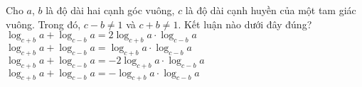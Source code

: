 \begin{ex}%
Cho $a$, $b$ là độ dài hai cạnh góc vuông, $c$ là độ dài cạnh huyền của một tam giác vuông. Trong đó, $c-b\ne 1$ và $c+b\ne 1$. Kết luận nào dưới đây đúng?
\choice
{\True $\log_{c+b}a+\log_{c-b}a=2\log_{c+b}a\cdot\log_{c-b}a$}
{$\log_{c+b}a+\log_{c-b}a=\log_{c+b}a\cdot\log_{c-b}a$}
{$\log_{c+b}a+\log_{c-b}a=-2\log_{c+b}a\cdot\log_{c-b}a$}
{$\log_{c+b}a+\log_{c-b}a=-\log_{c+b}a\cdot\log_{c-b}a$}
\end{ex}

